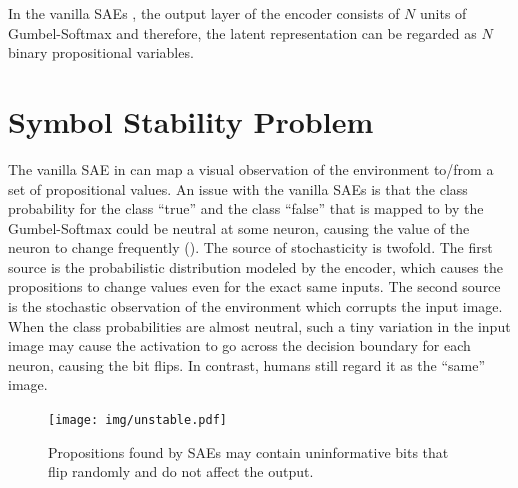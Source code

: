 In the vanilla SAEs \cite{Asai2018}, the output layer of the encoder consists of $N$ units of Gumbel-Softmax
and therefore, the latent representation can be regarded as $N$ binary propositional variables.




\section{Symbol Stability Problem}
\label{issues}

The vanilla SAE in \latentplanner can map a visual observation of the environment to/from a set of propositional values.
An issue with the vanilla SAEs is that the class probability for the class ``true'' and the class ``false''
that is mapped to by the Gumbel-Softmax could be neutral at some neuron,
causing the value of the neuron to change frequently ().
The source of stochasticity is twofold.
The first source is the probabilistic distribution modeled by the encoder,
which causes the propositions to change values even for the exact same inputs.
The second source is the stochastic observation of the environment which corrupts the input image.
When the class probabilities are almost neutral,
such a tiny variation in the input image may cause the activation to go across the decision boundary for each neuron,
causing the bit flips.
In contrast, humans still regard it as the ``same'' image.

\begin{figure}[tb]
 \centering
 \texttt{[image: img/unstable.pdf]}
 \caption{Propositions found by SAEs may contain uninformative bits
 that flip randomly and do not affect the output.}
 \label{unstable}
\end{figure}

